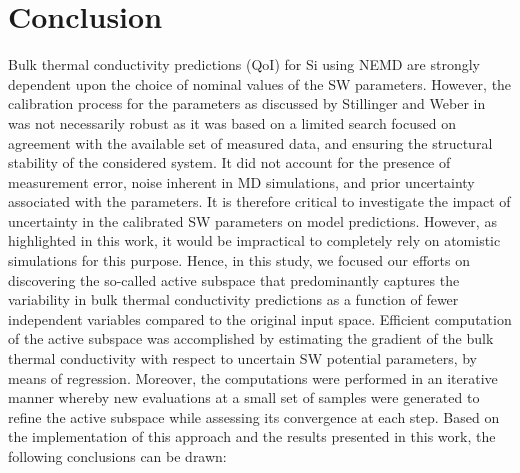 \section{Conclusion}
\label{sec:conc}

Bulk thermal conductivity predictions (QoI) for Si using NEMD are strongly dependent upon the
choice of nominal values of the SW parameters. However, the calibration process for the
parameters as discussed by Stillinger and Weber in~\cite{Stillinger:1985} was not
necessarily robust as it was based on a limited search focused on agreement with the 
available set of measured data, and ensuring the structural stability of the considered system. 
It did not account for the presence of measurement error, noise inherent in MD simulations,
and prior uncertainty associated with the parameters. It is therefore critical to
investigate the impact of uncertainty in the calibrated SW parameters on model predictions.
However, as highlighted in this work, it would be impractical to completely rely on
atomistic simulations for this purpose. Hence, in this study, we focused our efforts on
discovering the so-called active subspace that predominantly captures the variability
in bulk thermal conductivity predictions as a function of fewer independent variables
compared to the original input space. Efficient computation of the active subspace
was accomplished by estimating the gradient of the bulk thermal conductivity with
respect to uncertain SW potential parameters, by means of regression. Moreover, the
computations were performed in an iterative manner whereby new evaluations at a 
small set of samples were generated to refine the active subspace while assessing 
its convergence at each step.
Based on the implementation of this approach and the results
presented in this work, the following conclusions can be drawn:
%
